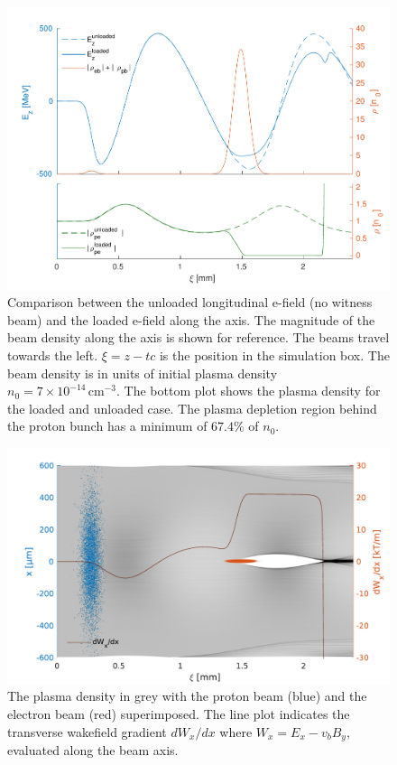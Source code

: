 \documentclass[aps,prstab,reprint,amsmath,amssymb,groupedaddress]{revtex4-1}
\newcommand{\unit}[1]{\,\mathrm{#1}}
\newcommand{\nexp}[1]{\times 10^{#1}}
\begin{document}
\begin{figure}[hbt]
    \includegraphics[width=0.99\linewidth,trim={4mm 0mm 4mm 0mm},clip]{figures/beamLoading}
    \caption{\label{Fig:BeamLoading} Comparison between the unloaded longitudinal e-field (no witness beam) and the
        loaded e-field along the axis. The magnitude of the beam density along the axis is shown for reference. The
        beams travel towards the left. $\xi = z - tc$ is the position in the simulation box. The beam density is in
        units of initial plasma density $n_{0} = 7\nexp{-14}\unit{cm}^{-3}$. The bottom plot shows the plasma density
        for the loaded and unloaded case. The plasma depletion region behind the proton bunch has a minimum of $67.4\%${}
        of $n_{0}$. }
\end{figure}

\begin{figure}[hbt]
    \includegraphics[width=0.99\linewidth,trim={4mm 0mm 4mm 0mm},clip]{figures/plasmaDenTWake}
    \caption{\label{Fig:PlasmaDenTWake} The plasma density in grey with the proton beam (blue) and the electron beam
        (red) superimposed. The line plot indicates the transverse wakefield gradient $dW_{x}/dx$ where
        $W_{x} = E_{x} - v_{b} B_{y}$, evaluated along the beam axis.}
\end{figure}
\end{document}
